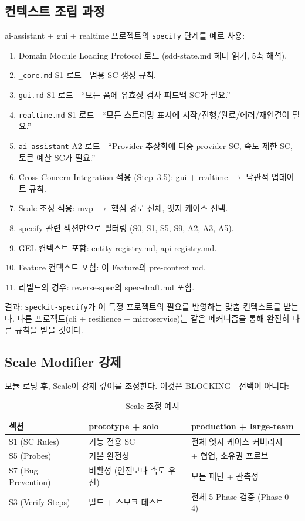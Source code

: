 \documentclass[11pt,a4paper,openright,twoside]{report}
\newcommand{\file}[1]{\texttt{#1}}
\begin{document}
\subsection{컨텍스트 조립 과정}

ai-assistant + gui + realtime 프로젝트의 \texttt{specify} 단계를 예로 사용:

\begin{enumerate}
  \item Domain Module Loading Protocol 로드 (sdd-state.md 헤더 읽기, 5축 해석).
  \item \file{\_core.md} S1 로드---범용 SC 생성 규칙.
  \item \file{gui.md} S1 로드---``모든 폼에 유효성 검사 피드백 SC가 필요.''
  \item \file{realtime.md} S1 로드---``모든 스트리밍 표시에 시작/진행/완료/에러/재연결이 필요.''
  \item \file{ai-assistant} A2 로드---``Provider 추상화에 다중 provider SC, 속도 제한 SC, 토큰 예산 SC가 필요.''
  \item Cross-Concern Integration 적용 (Step~3.5): gui + realtime $\rightarrow$ 낙관적 업데이트 규칙.
  \item Scale 조정 적용: mvp $\rightarrow$ 핵심 경로 전체, 엣지 케이스 선택.
  \item specify 관련 섹션만으로 필터링 (S0, S1, S5, S9, A2, A3, A5).
  \item GEL 컨텍스트 포함: entity-registry.md, api-registry.md.
  \item Feature 컨텍스트 포함: 이 Feature의 pre-context.md.
  \item 리빌드의 경우: reverse-spec의 spec-draft.md 포함.
\end{enumerate}

결과: \texttt{speckit-specify}가 이 특정 프로젝트의 필요를 반영하는 맞춤 컨텍스트를 받는다. 다른 프로젝트(cli + resilience + microservice)는 같은 메커니즘을 통해 완전히 다른 규칙을 받을 것이다.

\subsection{Scale Modifier 강제}

모듈 로딩 후, Scale이 강제 깊이를 조정한다. 이것은 BLOCKING---선택이 아니다:

\begin{table}[H]
\centering
\caption{Scale 조정 예시}
\label{tab:scale-adjust}
\begin{tabularx}{\textwidth}{lXX}
\toprule
\textbf{섹션} & \textbf{prototype + solo} & \textbf{production + large-team} \\
\midrule
S1 (SC Rules) & 기능 전용 SC & 전체 엣지 케이스 커버리지 \\
S5 (Probes) & 기본 완전성 & + 협업, 소유권 프로브 \\
S7 (Bug Prevention) & 비활성 (안전보다 속도 우선) & 모든 패턴 + 관측성 \\
S3 (Verify Steps) & 빌드 + 스모크 테스트 & 전체 5-Phase 검증 (Phase 0--4) \\
\bottomrule
\end{tabularx}
\end{table}
\end{document}
